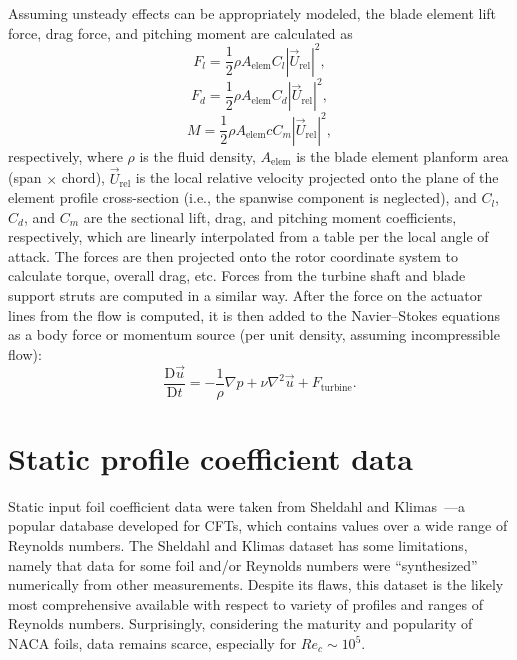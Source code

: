 \documentclass[times]{weauth}
\begin{document}
Assuming unsteady effects can be appropriately modeled, the blade element lift
force, drag force, and pitching moment are calculated as
\begin{equation}
    F_l = \frac{1}{2} \rho A_\mathrm{elem} C_l |\vec{U}_\mathrm{rel}|^2,
\end{equation}
\begin{equation}
    F_d = \frac{1}{2} \rho A_\mathrm{elem} C_d |\vec{U}_\mathrm{rel}|^2,
\end{equation}
\begin{equation}
    M = \frac{1}{2} \rho A_\mathrm{elem} c C_m |\vec{U}_\mathrm{rel}|^2,
\end{equation}
respectively, where $\rho$ is the fluid density, $A_\mathrm{elem}$ is the blade
element planform area (span $\times$ chord), $\vec{U}_\mathrm{rel}$ is the local
relative velocity projected onto the plane of the element profile cross-section
(i.e., the spanwise component is neglected), and $C_l$, $C_d$, and $C_m$ are the
sectional lift, drag, and pitching moment coefficients, respectively, which are
linearly interpolated from a table per the local angle of attack. The forces are
then projected onto the rotor coordinate system to calculate torque, overall
drag, etc. Forces from the turbine shaft and blade support struts are computed
in a similar way. After the force on the actuator lines from the flow is
computed, it is then added to the Navier--Stokes equations as a body force or
momentum source (per unit density, assuming incompressible flow):
\begin{equation}
    \frac{\mathrm{D} \vec{u}}{\mathrm{D} t} = - \frac{1}{\rho} \nabla p + \nu
    \nabla^2 \vec{u} + F_\mathrm{turbine}.
\end{equation}



\section{Static profile coefficient data}

Static input foil coefficient data were taken from Sheldahl and
Klimas~\cite{Sheldahl1981}---a popular database developed for CFTs, which
contains values over a wide range of Reynolds numbers. The Sheldahl and Klimas
dataset has some limitations, namely that data for some foil and/or Reynolds
numbers were ``synthesized'' numerically from other measurements. Despite its
flaws, this dataset is the likely most comprehensive available with respect to
variety of profiles and ranges of Reynolds numbers. Surprisingly, considering
the maturity and popularity of NACA foils, data remains scarce, especially for
$Re_c \sim 10^5$.
\end{document}
